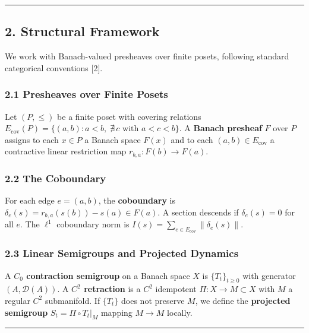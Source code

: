 \documentclass[
]{article}
\begin{document}
\begin{center}\rule{0.5\linewidth}{0.5pt}\end{center}

\subsection{2. Structural Framework}\label{structural-framework}

We work with Banach-valued presheaves over finite posets, following
standard categorical conventions {[}2{]}.

\subsubsection{2.1 Presheaves over Finite
Posets}\label{presheaves-over-finite-posets}

Let \((P, \leq)\) be a finite poset with covering relations
\(E_{\text{cov}}(P) = \{(a, b) : a < b,\; \nexists\, c \text{ with } a < c < b\}\).
A \textbf{Banach presheaf} \(F\) over \(P\) assigns to each \(x \in P\)
a Banach space \(F(x)\) and to each \((a,b) \in E_{\text{cov}}\) a
contractive linear restriction map \(r_{b,a}: F(b) \to F(a)\).

\subsubsection{2.2 The Coboundary}\label{the-coboundary}

For each edge \(e = (a,b)\), the \textbf{coboundary} is
\(\delta_e(s) = r_{b,a}(s(b)) - s(a) \in F(a)\). A section descends if
\(\delta_e(s) = 0\) for all \(e\). The \(\ell^1\) coboundary norm is
\(I(s) = \sum_{e \in E_{\text{cov}}} \|\delta_e(s)\|\).

\subsubsection{2.3 Linear Semigroups and Projected
Dynamics}\label{linear-semigroups-and-projected-dynamics}

A \textbf{\(C_0\) contraction semigroup} on a Banach space \(X\) is
\(\{T_t\}_{t \geq 0}\) with generator \((A, \mathcal{D}(A))\). A
\textbf{\(C^2\) retraction} is a \(C^2\) idempotent
\(\Pi: X \to M \subset X\) with \(M\) a regular \(C^2\) submanifold. If
\(\{T_t\}\) does not preserve \(M\), we define the \textbf{projected
semigroup} \(S_t = \Pi \circ T_t|_M\) mapping \(M \to M\) locally.

\begin{center}\rule{0.5\linewidth}{0.5pt}\end{center}
\end{document}
